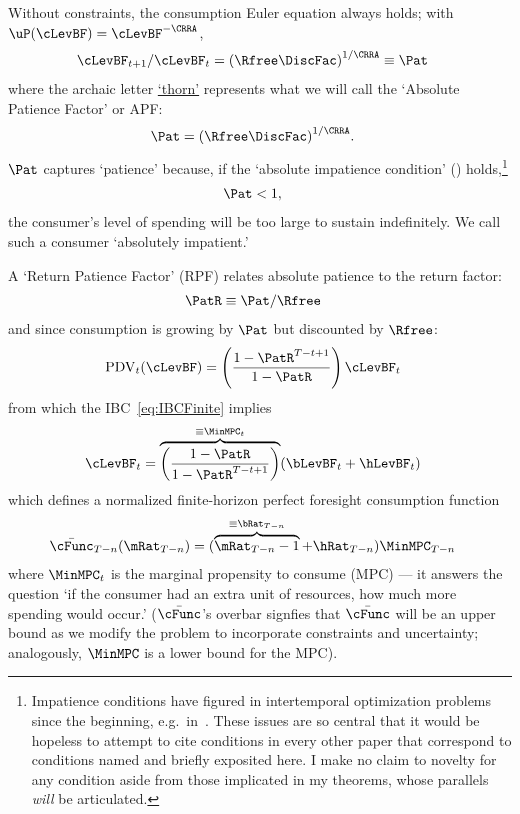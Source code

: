 \documentclass[BufferStockTheory]{subfiles}
\begin{document}
Without constraints, the consumption Euler equation always holds; with $\uP(\cLevBF)=\cLevBF^{-\CRRA}$, \hypertarget{Pat}{}
\begin{align}
  \cLevBF_{t+1}/\cLevBF_{t}  & = {(\Rfree\DiscFac)}^{1/\CRRA} \equiv \Pat   \label{eq:Pat}
\end{align}
where the archaic letter \href{https://en.wikipedia.org/wiki/Thorn_(letter)}{`thorn'} represents what we will call the `Absolute Patience Factor' or APF:\@
\begin{align}
  \Pat & = {(\Rfree\DiscFac)}^{1/\CRRA} \label{eq:APF}.
\end{align}
$\Pat$ captures `patience' because, if the `absolute impatience condition' (\AIC) holds,\footnote{Impatience conditions have figured in intertemporal optimization problems since the beginning, e.g.\ in~\cite{ramseySave}.  These issues are so central that it would be hopeless to attempt to cite conditions in every other paper that correspond to conditions named and briefly exposited here.  I make no claim to novelty for any condition aside from those implicated in my theorems, whose parallels \textit{will} be articulated.}
\begin{align}
  \label{eq:AIC}
  \Pat  & < 1,
\end{align}
the consumer's level of spending will be too large to sustain indefinitely.  We call such a consumer `absolutely impatient.'\hypertarget{RPF}{}

A `Return Patience Factor' (RPF) relates absolute patience to the return factor:
\begin{align}
  \PatR  & \equiv  {\Pat}/\Rfree \label{eq:PatR}
\end{align}
and since consumption is growing by $\Pat$ but discounted by $\Rfree$:
\begin{align}
  \mathrm{PDV}_{t}(\cLevBF)  & = \left(\frac{1-\PatR^{T-t+1}}{1-\PatR}\right)\cLevBF_{t}
\end{align}
from which the IBC~\eqref{eq:IBCFinite} implies
\begin{align}
  \cLevBF_{t}  & = \overbrace{\left(\frac{1-\PatR}{1-\PatR^{T-t+1}}\right)}^{\equiv \MinMPC_{t}}
                 (\bLevBF_{t}+\hLevBF_{t})   \label{eq:WDef}
\end{align}
which defines a normalized finite-horizon perfect foresight consumption function
\begin{align}
  \bar{\cFunc}_{T-n}(\mRat_{T-n})  & = (\overbrace{\mRat_{T-n}-1}^{
                                     \equiv\bRat_{T-n}}+\hRat_{T-n})\MinMPC_{T-n}
\end{align}
where $\MinMPC_{t}$ is the marginal propensity to consume (MPC) --- it answers the
question `if the consumer had an extra unit of resources, how much more spending would occur.' \hypertarget{RIC}{}
($\bar{\cFunc}$'s overbar signfies that $\bar{\cFunc}$ will be an upper bound as we modify the problem to incorporate constraints and uncertainty; analogously, $\MinMPC$ is a lower bound for the MPC).
\end{document}
